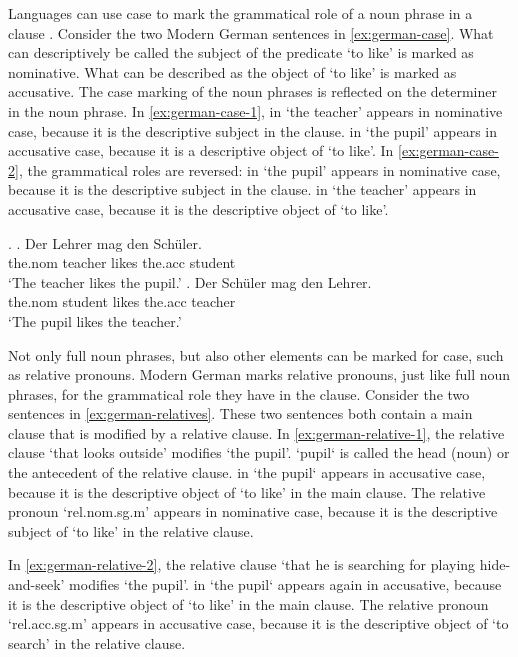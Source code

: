 Languages can use case to mark the grammatical role of a noun phrase in a clause \citep[cf.][]{moravcsik2009}. Consider the two Modern German sentences in \ref{ex:german-case}. What can descriptively be called the subject of the predicate  `to like' is marked as nominative. What can be described as the object of  `to like' is marked as accusative. The case marking of the noun phrases is reflected on the determiner in the noun phrase.
In \ref{ex:german-case-1},  in  `the teacher' appears in nominative case, because it is the descriptive subject in the clause.  in  `the pupil' appears in accusative case, because it is a descriptive object of  `to like'.
In \ref{ex:german-case-2}, the grammatical roles are reversed:  in  `the pupil' appears in nominative case, because it is the descriptive subject in the clause.  in  `the teacher' appears in accusative case, because it is the descriptive object of  `to like'.

\ex.\label{ex:german-case}
\ag. Der Lehrer mag den Schüler.\\
 the.\ac{nom} teacher likes the.\ac{acc} student\\
 `The teacher likes the pupil.'\label{ex:german-case-1}
\bg. Der Schüler mag den Lehrer.\\
 the.\ac{nom} student likes the.\ac{acc} teacher\\
 `The pupil likes the teacher.'\label{ex:german-case-2}

Not only full noun phrases, but also other elements can be marked for case, such as relative pronouns. Modern German marks relative pronouns, just like full noun phrases, for the grammatical role they have in the clause. Consider the two sentences in \ref{ex:german-relatives}. These two sentences both contain a main clause that is modified by a relative clause.
In \ref{ex:german-relative-1}, the relative clause  `that looks outside' modifies  `the pupil'.  `pupil` is called the head (noun) or the antecedent of the relative clause.  in  `the pupil` appears in accusative case, because it is the descriptive object of  `to like' in the main clause. The relative pronoun  `\ac{rel}.\ac{nom}.\ac{sg}.\ac{m}' appears in nominative case, because it is the descriptive subject of  `to like' in the relative clause.

In \ref{ex:german-relative-2}, the relative clause  `that he is searching for playing hide-and-seek' modifies  `the pupil'.  in  `the pupil` appears again in accusative, because it is the descriptive object of  `to like' in the main clause. The relative pronoun  `\ac{rel}.\ac{acc}.\ac{sg}.\ac{m}' appears in accusative case, because it is the descriptive object of  `to search' in the relative clause.

